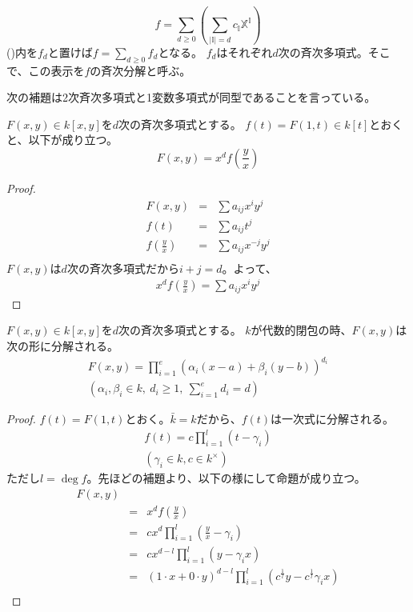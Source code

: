 \documentclass[a4paper]{jsarticle}
\begin{document}
    \[
        f=\sum_{d \geq 0}{ \left( \sum_{|\mathbb{I}|=d}{c_{\mathbb{I}} \mathbb{X}^{\mathbb{I}}} \right)}
    \]
    ()内を$f_d$と置けば$f=\sum_{d \geq 0}{f_d}$となる。
    $f_d$はそれぞれ$d$次の斉次多項式。そこで、この表示を$f$の斉次分解と呼ぶ。

    次の補題は2次斉次多項式と1変数多項式が同型であることを言っている。
    \begin{Lemma}
        $F(x, y) \in k[x,y]$を$d$次の斉次多項式とする。
        $f(t)=F(1, t) \in k[t]$とおくと、以下が成り立つ。
        \[ F(x, y)= x^d f(\frac{y}{x})\]
    \end{Lemma}
    \begin{proof}
        \begin{eqnarray*}
            F(x, y) &=& \sum{a_{ij} x^{i} y^{j}} \\
            f(t)    &=& \sum{a_{ij} t^{j}} \\
            f\left( \frac{y}{x} \right)&=& \sum{a_{ij} x^{-j} y^{j}} \\
        \end{eqnarray*}
        $F(x, y)$は$d$次の斉次多項式だから$i+j=d$。よって、
        \begin{eqnarray*}
            x^d f\left( \frac{y}{x} \right)=\sum{a_{ij} x^{i} y^{j}}
        \end{eqnarray*}
        
    \end{proof}

    \begin{Prop}
        $F(x, y) \in k[x,y]$を$d$次の斉次多項式とする。
        $k$が代数的閉包の時、$F(x, y)$は次の形に分解される。
        \begin{gather*}
            F(x, y)=\prod^{e}_{i=1} (\alpha_{i}(x-a)+\beta_{i}(y-b))^{d_{i}} \\
            ( \alpha_{i},\beta_{i} \in k,~ d_i \geq 1,~ \sum^e_{i=1}{d_i}=d )
        \end{gather*}
    \end{Prop}
    \begin{proof}
        $f(t)=F(1, t)$とおく。$\bar{k}=k$だから、$f(t)$は一次式に分解される。
        \begin{gather*}
            f(t) = c \prod_{i=1}^{l}{(t-\gamma_{i})} \\
            (\gamma_{i} \in k, c \in k^{\times})
        \end{gather*}
        ただし$l=\deg f$。先ほどの補題より、以下の様にして命題が成り立つ。
        \begin{eqnarray*}
            F(x, y) \\
            &=& x^{d} f\left( \frac{y}{x} \right) \\
            &=& c x^{d} \prod_{i=1}^{l}{ \left( \frac{y}{x} - \gamma_{i} \right)} \\
            &=& c x^{d-l} \prod_{i=1}^{l}{ \left( y - \gamma_{i}x \right)} \\
            &=& (1 \cdot x + 0 \cdot y)^{d-l} \prod_{i=1}^{l}{ \left( c^{\frac{1}{l}}y - c^{\frac{1}{l}}\gamma_{i}x \right)} \\
        \end{eqnarray*}
        
    \end{proof}
\end{document}
